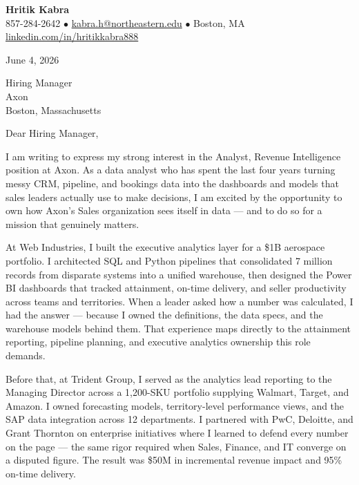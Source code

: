 \documentclass[letterpaper,11pt]{article}
\begin{document}
{\large \color{heading} \textbf{Hritik Kabra}} \\
857-284-2642 \enspace $\bullet$ \enspace \href{mailto:kabra.h@northeastern.edu}{kabra.h@northeastern.edu} \enspace $\bullet$ \enspace Boston, MA \\
\href{https://www.linkedin.com/in/hritikkabra888}{linkedin.com/in/hritikkabra888}

\vspace{12pt}

June 4, 2026

\vspace{6pt}

Hiring Manager \\
Axon \\
Boston, Massachusetts

\vspace{6pt}

Dear Hiring Manager,

I am writing to express my strong interest in the Analyst, Revenue Intelligence position at Axon. As a data analyst who has spent the last four years turning messy CRM, pipeline, and bookings data into the dashboards and models that sales leaders actually use to make decisions, I am excited by the opportunity to own how Axon's Sales organization sees itself in data --- and to do so for a mission that genuinely matters.

At Web Industries, I built the executive analytics layer for a \$1B aerospace portfolio. I architected SQL and Python pipelines that consolidated 7 million records from disparate systems into a unified warehouse, then designed the Power BI dashboards that tracked attainment, on-time delivery, and seller productivity across teams and territories. When a leader asked how a number was calculated, I had the answer --- because I owned the definitions, the data specs, and the warehouse models behind them. That experience maps directly to the attainment reporting, pipeline planning, and executive analytics ownership this role demands.

Before that, at Trident Group, I served as the analytics lead reporting to the Managing Director across a 1,200-SKU portfolio supplying Walmart, Target, and Amazon. I owned forecasting models, territory-level performance views, and the SAP data integration across 12 departments. I partnered with PwC, Deloitte, and Grant Thornton on enterprise initiatives where I learned to defend every number on the page --- the same rigor required when Sales, Finance, and IT converge on a disputed figure. The result was \$50M in incremental revenue impact and 95\% on-time delivery.
\end{document}
